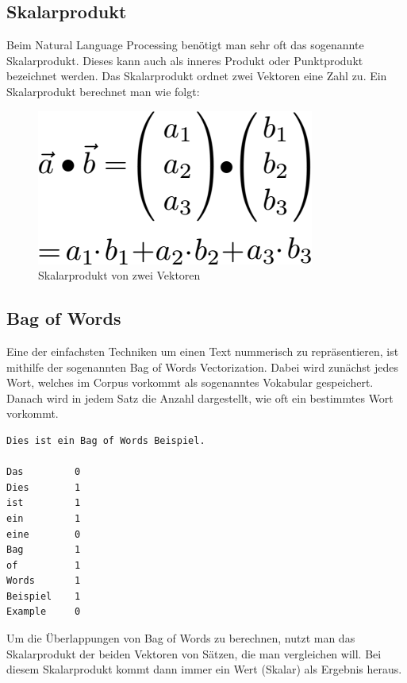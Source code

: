 \subsection{Skalarprodukt}

Beim Natural Language Processing benötigt man sehr oft das sogenannte Skalarprodukt. Dieses kann auch als inneres Produkt oder Punktprodukt bezeichnet werden.
Das Skalarprodukt ordnet zwei Vektoren eine Zahl zu.
Ein Skalarprodukt berechnet man wie folgt:

\begin{figure}[hbt!]
    \centering
    \includegraphics[scale=0.5]{pics/dot-product}
    \caption{Skalarprodukt von zwei Vektoren~\cite{dotProduct}}
    \label{fig:dot-product}
\end{figure}

\subsection{Bag of Words}

Eine der einfachsten Techniken um einen Text nummerisch zu repräsentieren, ist mithilfe der sogenannten Bag of Words Vectorization.
Dabei wird zunächst jedes Wort, welches im Corpus vorkommt als sogenanntes Vokabular gespeichert.
Danach wird in jedem Satz die Anzahl dargestellt, wie oft ein bestimmtes Wort vorkommt.\cite{textAnalysisMonkeylearn}

\begin{lstlisting}[label={lst: Bag of Words Beispiel}]
Dies ist ein Bag of Words Beispiel.

Das         0
Dies        1
ist         1
ein         1
eine        0
Bag         1
of          1
Words       1
Beispiel    1
Example     0
\end{lstlisting}

Um die Überlappungen von Bag of Words zu berechnen, nutzt man das Skalarprodukt der beiden Vektoren von Sätzen, die man vergleichen will.
Bei diesem Skalarprodukt kommt dann immer ein Wert (Skalar) als Ergebnis heraus.


